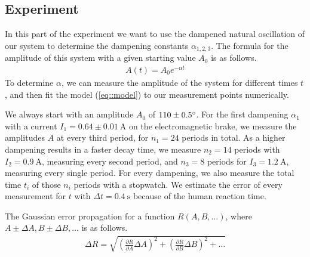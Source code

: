 \subsection{Experiment}
In this part of the experiment we want to use the dampened natural oscillation of our system to determine the dampening constants $\alpha_{1, 2, 3}$.
The formula for the amplitude of this system with a given starting value $A_0$ is  as follows.
\begin{align}
	A(t) = A_0 e^{-\alpha t}
	\label{eq::model}
\end{align} 
To determine $\alpha$, we can measure the amplitude of the system for different times $t$, and then fit the model (\ref{eq::model}) to our measurement points numerically.

We always start with an amplitude $A_0$ of $110 \pm 0.5 \degree$.
For the first dampening $\alpha_1$ with a current $I_1 = 0.64 \pm \SI{0.01}{\ampere}$ on the electromagnetic brake, we measure the amplitudes $A$ at every third period, for $n_1 = 24$ periods in total.
As a higher dampening results in a faster decay time, we measure $n_2 = 14$ periods with $I_2 = \SI{0.9}{\ampere}$, measuring every second period, and $n_3 = 8$ periods for $I_3 = \SI{1.2}{\ampere}$, measuring every single period.
For every dampening, we also measure the total time $t_i$ of those $n_i$ periods with a stopwatch. We estimate the error of every measurement for $t$ with $\Delta t = \SI{0.4}{\second}$ because of the human reaction time.


The Gaussian error propagation for a function $R(A, B, \dots)$, where $A \pm \Delta A, B \pm \Delta B, \dots$ is as follows.
\begin{align}
	\Delta R = \sqrt{\left(\frac{\partial R}{\partial A} \Delta A\right)^2 + \left(\frac{\partial R}{\partial B} \Delta B\right)^2 + \dots}
	\label{eq::gauss}
\end{align}
